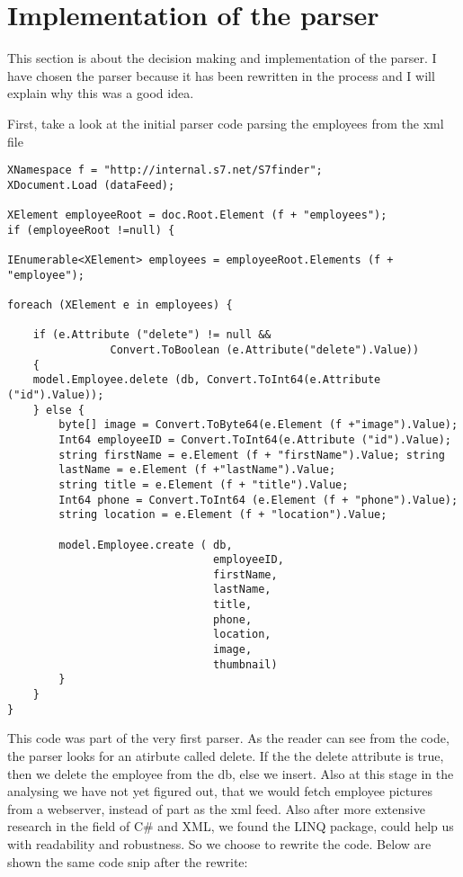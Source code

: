 \section{Implementation of the parser}
    This section is about the decision making and implementation of the parser.
    I have chosen the parser because it has been rewritten in the process and I
    will explain why this was a good idea.

    First, take a look at the initial parser code parsing the employees from
    the xml file

    \begin{lstlisting}
XNamespace f = "http://internal.s7.net/S7finder";
XDocument.Load (dataFeed);

XElement employeeRoot = doc.Root.Element (f + "employees"); 
if (employeeRoot !=null) { 
    
IEnumerable<XElement> employees = employeeRoot.Elements (f + "employee");

foreach (XElement e in employees) {

    if (e.Attribute ("delete") != null && 
                Convert.ToBoolean (e.Attribute("delete").Value)) 
    { 
    model.Employee.delete (db, Convert.ToInt64(e.Attribute ("id").Value));
    } else { 
        byte[] image = Convert.ToByte64(e.Element (f +"image").Value); 
        Int64 employeeID = Convert.ToInt64(e.Attribute ("id").Value); 
        string firstName = e.Element (f + "firstName").Value; string 
        lastName = e.Element (f +"lastName").Value; 
        string title = e.Element (f + "title").Value;
        Int64 phone = Convert.ToInt64 (e.Element (f + "phone").Value);
        string location = e.Element (f + "location").Value;

        model.Employee.create ( db,
                                employeeID, 
                                firstName, 
                                lastName, 
                                title, 
                                phone, 
                                location, 
                                image, 
                                thumbnail) 
        } 
    } 
}
    \end{lstlisting}

    This code was part of the very first parser. As the reader can see from the
    code, the parser looks for an atirbute called delete. If the the delete
    attribute is true, then we delete the employee from the db, else we insert.
    Also at this stage in the analysing we have not yet figured out, that we would
    fetch employee pictures from a webserver, instead of part as the xml feed. Also
    after more extensive research in the field of C\# and XML, we found the LINQ
    package, could help us with readability and robustness. So we choose to rewrite
    the code. Below are shown the same code snip after the rewrite:

